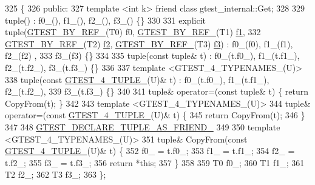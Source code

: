 \begin{DoxyCode}
325                         \{
326  \textcolor{keyword}{public}:
327   \textcolor{keyword}{template} <\textcolor{keywordtype}{int} k> \textcolor{keyword}{friend} \textcolor{keyword}{class }gtest\_internal::Get;
328 
329   tuple() : f0\_(), f1\_(), f2\_(), f3\_() \{\}
330 
331   \textcolor{keyword}{explicit} tuple(\hyperlink{gtest-tuple_8h_adcf9057737a411d833fac0382c13a181}{GTEST\_BY\_REF\_}(T0) f0, \hyperlink{gtest-tuple_8h_adcf9057737a411d833fac0382c13a181}{GTEST\_BY\_REF\_}(T1) 
      \hyperlink{namespacestd_1_1tr1_a9c0fa65b105f8e2f58ba59ecf75fd000}{f1},
332       \hyperlink{gtest-tuple_8h_adcf9057737a411d833fac0382c13a181}{GTEST\_BY\_REF\_}(T2) \hyperlink{namespacestd_1_1tr1_a87dd9e009868361317f587126dba63d4}{f2}, \hyperlink{gtest-tuple_8h_adcf9057737a411d833fac0382c13a181}{GTEST\_BY\_REF\_}(T3) \hyperlink{namespacestd_1_1tr1_a0f7c3b47d27d42d82d1a333ea420ce4e}{f3}) : f0\_(f0), f1\_(f1), f2\_(f2)
      ,
333       f3\_(f3) \{\}
334 
335   tuple(\textcolor{keyword}{const} tuple& t) : f0\_(t.f0\_), f1\_(t.f1\_), f2\_(t.f2\_), f3\_(t.f3\_) \{\}
336 
337   \textcolor{keyword}{template} <GTEST\_4\_TYPENAMES\_(U)>
338   tuple(\textcolor{keyword}{const} \hyperlink{gtest-tuple_8h_a3625feb24d5e6eb9926fd558e4a2e3ff}{GTEST\_4\_TUPLE\_}(U)& t) : f0\_(t.f0\_), f1\_(t.f1\_), f2\_(t.f2\_),
339       f3\_(t.f3\_) \{\}
340 
341   tuple& operator=(\textcolor{keyword}{const} tuple& t) \{ \textcolor{keywordflow}{return} CopyFrom(t); \}
342 
343   \textcolor{keyword}{template} <GTEST\_4\_TYPENAMES\_(U)>
344   tuple& operator=(\textcolor{keyword}{const} \hyperlink{gtest-tuple_8h_a3625feb24d5e6eb9926fd558e4a2e3ff}{GTEST\_4\_TUPLE\_}(U)& t) \{
345     \textcolor{keywordflow}{return} CopyFrom(t);
346   \}
347 
348   \hyperlink{gtest-tuple_8h_a2b20671273f514a88a6e9b8328e5f257}{GTEST\_DECLARE\_TUPLE\_AS\_FRIEND\_}
349 
350   \textcolor{keyword}{template} <GTEST\_4\_TYPENAMES\_(U)>
351   tuple& CopyFrom(\textcolor{keyword}{const} \hyperlink{gtest-tuple_8h_a3625feb24d5e6eb9926fd558e4a2e3ff}{GTEST\_4\_TUPLE\_}(U)& t) \{
352     f0\_ = t.f0\_;
353     f1\_ = t.f1\_;
354     f2\_ = t.f2\_;
355     f3\_ = t.f3\_;
356     \textcolor{keywordflow}{return} *\textcolor{keyword}{this};
357   \}
358 
359   T0 f0\_;
360   T1 f1\_;
361   T2 f2\_;
362   T3 f3\_;
363 \};
\end{DoxyCode}
